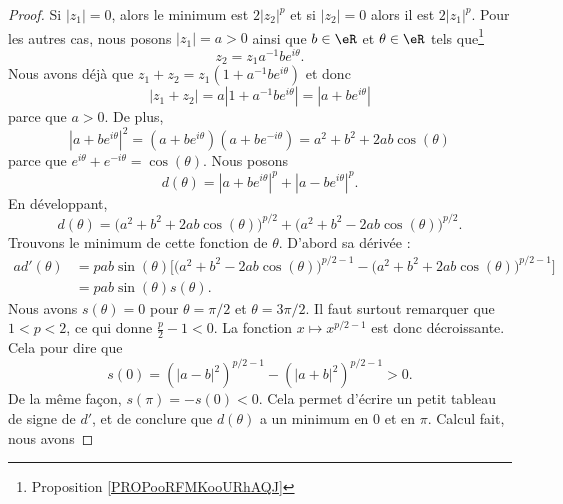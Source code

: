 \begin{proof}
    Si \( | z_1 |=0\), alors le minimum est \( 2| z_2 |^p\) et si \( | z_2 |=0\) alors il est \( 2| z_1 |^p\). Pour les autres cas, nous posons \( | z_1 |=a>0\) ainsi que \( b\in \eR\) et \( \theta\in \eR\) tels que\footnote{Proposition \ref{PROPooRFMKooURhAQJ}}
    \begin{equation}
        z_2=z_1a^{-1}b e^{i\theta}.
    \end{equation}
    Nous avons déjà que \( z_1+z_2=z_1(1+a^{-1}b e^{i\theta})\) et donc
    \begin{equation}
        | z_1+z_2 |=a| 1+a^{-1}b e^{i\theta} |=| a+b e^{i\theta} |
    \end{equation}
    parce que \( a>0\). De plus,
    \begin{equation}
        | a+b e^{i\theta} |^2= (a+b e^{i\theta})(a+b e^{-i\theta})=a^2+b^2+2ab\cos(\theta)
    \end{equation}
    parce que \(  e^{i\theta}+ e^{-i\theta}=\cos(\theta)\). Nous posons
    \begin{equation}
        d(\theta)=| a+b e^{i\theta} |^p+| a-b e^{i\theta} |^p.
    \end{equation}
    En développant,
    \begin{equation}
        d(\theta)=\big(a^2+b^2+2ab\cos(\theta)\big)^{p/2}+\big(a^2+b^2-2ab\cos(\theta)\big)^{p/2}.
    \end{equation}
    Trouvons le minimum de cette fonction de \( \theta\). D'abord sa dérivée :
    \begin{subequations}
        \begin{align}
            ad'(\theta) & =pab\sin(\theta)\big[ \big( a^2+b^2-2ab\cos(\theta) \big)^{p/2-1}-\big( a^2+b^2+2ab\cos(\theta) \big)^{p/2-1}  \big] \\
                        & =pab\sin(\theta)s(\theta).
        \end{align}
    \end{subequations}
    Nous avons \( s(\theta)=0\) pour \( \theta=\pi/2\) et \( \theta=3\pi/2\). Il faut surtout remarquer que \( 1<p<2\), ce qui donne \( \frac{ p }{2}-1<0\). La fonction \( x\mapsto x^{p/2-1}\) est donc décroissante. Cela pour dire que
    \begin{equation}
        s(0)=\left( | a-b |^2 \right)^{p/2-1}-\left( | a+b |^2 \right)^{p/2-1}>0.
    \end{equation}
    De la même façon, \( s(\pi)=-s(0)<0\). Cela permet d'écrire un petit tableau de signe de \( d'\), et de conclure que \( d(\theta)\) a un minimum en \( 0\) et en \( \pi\). Calcul fait, nous avons

\end{proof}
